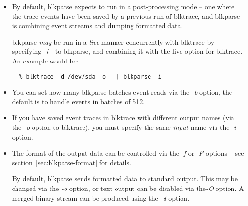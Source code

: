 \documentclass{article}
\begin{document}
\begin{itemize}
  \item By default, blkparse expects to run in a post-processing mode
  -- one where the trace events have been saved by a previous run
  of blktrace, and blkparse is combining event streams and dumping
  formatted data. 

  blkparse \emph{may} be run in a \emph{live} manner concurrently with
  blktrace by specifying \emph{-i -} to blkparse, and combining it with
  the live option for blktrace. An example would be:

  \begin{verbatim}
  % blktrace -d /dev/sda -o - | blkparse -i -
  \end{verbatim}

  \item You can set how many blkparse batches event reads via the
  \emph{-b} option, the default is to handle events in batches of 512.

  \item If you have saved event traces in blktrace with different output
  names (via the \emph{-o} option to blktrace), you must specify the
  same \emph{input} name via the \emph{-i} option.

  \item The format of the output data can be controlled via the \emph{-f}
  or \emph{-F} options -- see section~\ref{sec:blkparse-format} for details.

  By default, blkparse sends formatted data to standard output. This may
  be changed via the \emph{-o} option, or text output can be disabled
  via the\emph{-O} option. A merged binary stream can be produced using
  the \emph{-d} option.

\end{itemize}
\end{document}
